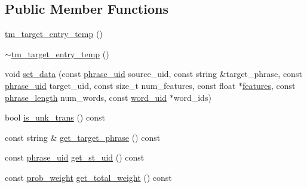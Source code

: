 \subsection*{Public Member Functions}
\begin{DoxyCompactItemize}
\item 
\hyperlink{classuva_1_1smt_1_1bpbd_1_1server_1_1tm_1_1models_1_1tm__target__entry__temp_a10d254c10a6cdeb7b5538d2fc1f29a96}{tm\+\_\+target\+\_\+entry\+\_\+temp} ()
\item 
\hyperlink{classuva_1_1smt_1_1bpbd_1_1server_1_1tm_1_1models_1_1tm__target__entry__temp_a07f3364da42bd07d8692ceefa95a60b3}{$\sim$tm\+\_\+target\+\_\+entry\+\_\+temp} ()
\item 
void \hyperlink{classuva_1_1smt_1_1bpbd_1_1server_1_1tm_1_1models_1_1tm__target__entry__temp_a019f83ab32f5b2b1c5becda8a0596732}{set\+\_\+data} (const \hyperlink{namespaceuva_1_1smt_1_1bpbd_1_1server_ad18d4cdf5504e76c22b0c124ff60b44f}{phrase\+\_\+uid} source\+\_\+uid, const string \&target\+\_\+phrase, const \hyperlink{namespaceuva_1_1smt_1_1bpbd_1_1server_ad18d4cdf5504e76c22b0c124ff60b44f}{phrase\+\_\+uid} target\+\_\+uid, const size\+\_\+t num\+\_\+features, const float $\ast$\hyperlink{feature__tests_8cxx_a1582568e32f689337602a16bf8a5bff0}{features}, const \hyperlink{namespaceuva_1_1smt_1_1bpbd_1_1server_af068a19c2e03116caf3e3827a3e40e35}{phrase\+\_\+length} num\+\_\+words, const \hyperlink{namespaceuva_1_1smt_1_1bpbd_1_1server_a6bfe45ba344d65a7fdd7d26156328ddc}{word\+\_\+uid} $\ast$word\+\_\+ids)
\item 
bool \hyperlink{classuva_1_1smt_1_1bpbd_1_1server_1_1tm_1_1models_1_1tm__target__entry__temp_ae3569c030f9ddb80f02912f4f4ba724c}{is\+\_\+unk\+\_\+trans} () const 
\item 
const string \& \hyperlink{classuva_1_1smt_1_1bpbd_1_1server_1_1tm_1_1models_1_1tm__target__entry__temp_a89fd2815eb087a9abb47040d842597ce}{get\+\_\+target\+\_\+phrase} () const 
\item 
const \hyperlink{namespaceuva_1_1smt_1_1bpbd_1_1server_ad18d4cdf5504e76c22b0c124ff60b44f}{phrase\+\_\+uid} \hyperlink{classuva_1_1smt_1_1bpbd_1_1server_1_1tm_1_1models_1_1tm__target__entry__temp_a321df85fef6d385d5edc0afce9296045}{get\+\_\+st\+\_\+uid} () const 
\item 
const \hyperlink{namespaceuva_1_1smt_1_1bpbd_1_1server_a01e9ea4de9c226f4464862e84ff0bbcc}{prob\+\_\+weight} \hyperlink{classuva_1_1smt_1_1bpbd_1_1server_1_1tm_1_1models_1_1tm__target__entry__temp_ae6c8b88c36a4eeb73926291688df1774}{get\+\_\+total\+\_\+weight} () const 

\end{DoxyCompactItemize}
